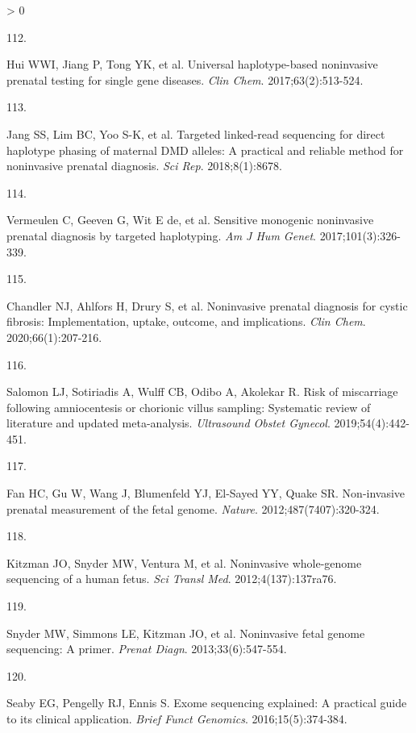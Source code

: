 \documentclass[11pt,letterpaper,oneside]{book}
\newlength{\cslhangindent}
\newlength{\csllabelwidth}
\newenvironment{CSLReferences}[3] %
 {%
  \setlength{\parindent}{0pt}
  \ifodd #1 \everypar{\setlength{\hangindent}{\cslhangindent}}\ignorespaces\fi
  \ifnum #2 > 0
  \setlength{\parskip}{#2\baselineskip}
  \fi
 }%
 {}
\newcommand{\CSLLeftMargin}[1]{\parbox[t]{\maxof{\widthof{#1}}{\csllabelwidth}}{#1}}
\newcommand{\CSLRightInline}[1]{\parbox[t]{\linewidth-\csllabelwidth}{#1}\newline}
\begin{document}
\begin{CSLReferences}{0}{0}
\leavevmode\hypertarget{ref-hui:2017aa}{}%
\CSLLeftMargin{112. }
\CSLRightInline{Hui WWI, Jiang P, Tong YK, et al. Universal haplotype-based noninvasive prenatal testing for single gene diseases. \emph{Clin Chem}. 2017;63(2):513-524.}

\leavevmode\hypertarget{ref-jang:2018aa}{}%
\CSLLeftMargin{113. }
\CSLRightInline{Jang SS, Lim BC, Yoo S-K, et al. Targeted linked-read sequencing for direct haplotype phasing of maternal DMD alleles: A practical and reliable method for noninvasive prenatal diagnosis. \emph{Sci Rep}. 2018;8(1):8678.}

\leavevmode\hypertarget{ref-vermeulen:2017aa}{}%
\CSLLeftMargin{114. }
\CSLRightInline{Vermeulen C, Geeven G, Wit E de, et al. Sensitive monogenic noninvasive prenatal diagnosis by targeted haplotyping. \emph{Am J Hum Genet}. 2017;101(3):326-339.}

\leavevmode\hypertarget{ref-chandler:2020aa}{}%
\CSLLeftMargin{115. }
\CSLRightInline{Chandler NJ, Ahlfors H, Drury S, et al. Noninvasive prenatal diagnosis for cystic fibrosis: Implementation, uptake, outcome, and implications. \emph{Clin Chem}. 2020;66(1):207-216.}

\leavevmode\hypertarget{ref-salomon:2019aa}{}%
\CSLLeftMargin{116. }
\CSLRightInline{Salomon LJ, Sotiriadis A, Wulff CB, Odibo A, Akolekar R. Risk of miscarriage following amniocentesis or chorionic villus sampling: Systematic review of literature and updated meta-analysis. \emph{Ultrasound Obstet Gynecol}. 2019;54(4):442-451.}

\leavevmode\hypertarget{ref-fan:2012aa}{}%
\CSLLeftMargin{117. }
\CSLRightInline{Fan HC, Gu W, Wang J, Blumenfeld YJ, El-Sayed YY, Quake SR. Non-invasive prenatal measurement of the fetal genome. \emph{Nature}. 2012;487(7407):320-324.}

\leavevmode\hypertarget{ref-kitzman:2012aa}{}%
\CSLLeftMargin{118. }
\CSLRightInline{Kitzman JO, Snyder MW, Ventura M, et al. Noninvasive whole-genome sequencing of a human fetus. \emph{Sci Transl Med}. 2012;4(137):137ra76.}

\leavevmode\hypertarget{ref-snyder:2013aa}{}%
\CSLLeftMargin{119. }
\CSLRightInline{Snyder MW, Simmons LE, Kitzman JO, et al. Noninvasive fetal genome sequencing: A primer. \emph{Prenat Diagn}. 2013;33(6):547-554.}

\leavevmode\hypertarget{ref-seaby:2016aa}{}%
\CSLLeftMargin{120. }
\CSLRightInline{Seaby EG, Pengelly RJ, Ennis S. Exome sequencing explained: A practical guide to its clinical application. \emph{Brief Funct Genomics}. 2016;15(5):374-384.}


\end{CSLReferences}
\end{document}
